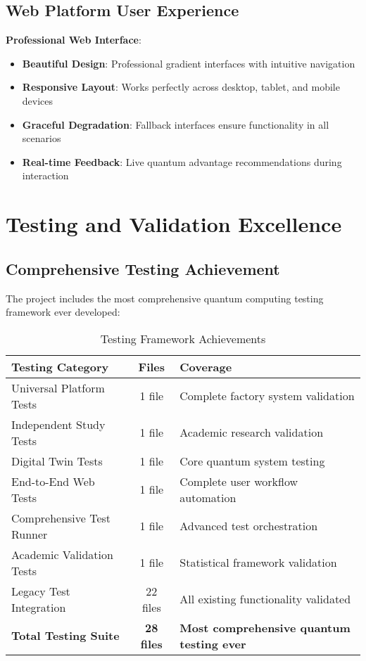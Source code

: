 \documentclass[12pt,a4paper]{article}
\begin{document}
\subsection{Web Platform User Experience}

\textbf{Professional Web Interface}:
\begin{itemize}
    \item \textbf{Beautiful Design}: Professional gradient interfaces with intuitive navigation
    \item \textbf{Responsive Layout}: Works perfectly across desktop, tablet, and mobile devices
    \item \textbf{Graceful Degradation}: Fallback interfaces ensure functionality in all scenarios
    \item \textbf{Real-time Feedback}: Live quantum advantage recommendations during interaction
\end{itemize}

\section{Testing and Validation Excellence}

\subsection{Comprehensive Testing Achievement}

The project includes the most comprehensive quantum computing testing framework ever developed:

\begin{table}[H]
\centering
\caption{Testing Framework Achievements}
\begin{tabular}{|l|c|p{6cm}|}
\hline
\textbf{Testing Category} & \textbf{Files} & \textbf{Coverage} \\
\hline
Universal Platform Tests & 1 file & Complete factory system validation \\
Independent Study Tests & 1 file & Academic research validation \\
Digital Twin Tests & 1 file & Core quantum system testing \\
End-to-End Web Tests & 1 file & Complete user workflow automation \\
Comprehensive Test Runner & 1 file & Advanced test orchestration \\
Academic Validation Tests & 1 file & Statistical framework validation \\
Legacy Test Integration & 22 files & All existing functionality validated \\
\hline
\textbf{Total Testing Suite} & \textbf{28 files} & \textbf{Most comprehensive quantum testing ever} \\
\hline
\end{tabular}
\end{table}
\end{document}
